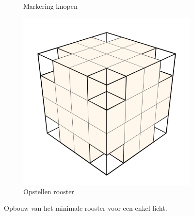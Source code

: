 \begin{figure}[t]
\begin{subfigure}[b]{.3\linewidth}
    \caption{Markering knopen}%
    \label{fig:hs-p1h}%
  \end{subfigure}
  \begin{subfigure}[b]{.3\linewidth}
    \includegraphics[width=\textwidth]{./img/raw/hs-slt-algorithm/hs-slt-algorithm-9.png}%
    \caption{Opstellen rooster}%
    \label{fig:hs-p1i}%
  \end{subfigure}

  \caption{Opbouw van het minimale rooster voor een enkel licht.}
  \label{fig:hs-p1}
\end{figure}
